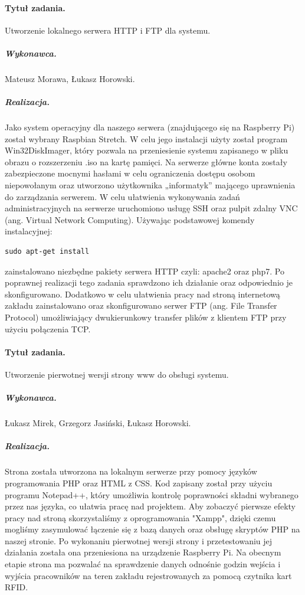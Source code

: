 \documentclass[a4paper]{article}
\begin{document}
\paragraph{Tytuł zadania.} Utworzenie lokalnego serwera HTTP i FTP dla systemu.
\subparagraph{Wykonawca.} Mateusz Morawa, Łukasz Horowski.
\subparagraph{Realizacja.} Jako system operacyjny dla naszego serwera (znajdującego się na Raspberry Pi) został wybrany Raspbian Stretch. W celu jego instalacji użyty został program Win32DiskImager, który pozwala na przeniesienie systemu zapisanego w pliku obrazu o rozszerzeniu .iso na kartę pamięci. Na serwerze główne konta zostały zabezpieczone mocnymi hasłami w celu ograniczenia dostępu osobom niepowołanym oraz utworzono użytkownika „informatyk” mającego uprawnienia do zarządzania serwerem. W celu ułatwienia wykonywania zadań administracyjnych na serwerze uruchomiono usługę SSH oraz pulpit zdalny VNC (ang. Virtual Network Computing). Używając podstawowej komendy instalacyjnej:
\begin{verbatim}
sudo apt-get install
\end{verbatim}
zainstalowano niezbędne pakiety serwera HTTP czyli: apache2 oraz php7. Po poprawnej realizacji tego zadania sprawdzono ich działanie oraz odpowiednio je skonfigurowano. Dodatkowo w celu ułatwienia pracy nad stroną internetową zakładu zainstalowano oraz skonfigurowano serwer FTP (ang. File Transfer Protocol) umożliwiający dwukierunkowy transfer plików z klientem FTP przy użyciu połączenia TCP.
 
\paragraph{Tytuł zadania.} Utworzenie pierwotnej wersji strony www do obsługi systemu.
\subparagraph{Wykonawca.} Łukasz Mirek, Grzegorz Jasiński, Łukasz Horowski.
\subparagraph{Realizacja.} Strona została utworzona na lokalnym serwerze przy pomocy języków programowania PHP oraz HTML z CSS. Kod zapisany został przy użyciu programu Notepad++, który umożliwia kontrolę poprawności składni wybranego przez nas języka, co ułatwia pracę nad projektem. Aby zobaczyć pierwsze efekty pracy nad stroną skorzystaliśmy z oprogramowania "Xampp", dzięki czemu mogliśmy zasymulować łączenie się z bazą danych oraz obsługę skryptów PHP na naszej stronie. Po wykonaniu pierwotnej wersji strony i przetestowaniu jej działania została ona przeniesiona na urządzenie Raspberry Pi. Na obecnym etapie strona ma pozwalać na sprawdzenie danych odnośnie godzin wejścia i wyjścia pracowników na teren zakładu rejestrowanych za pomocą czytnika kart RFID.  
\end{document}
